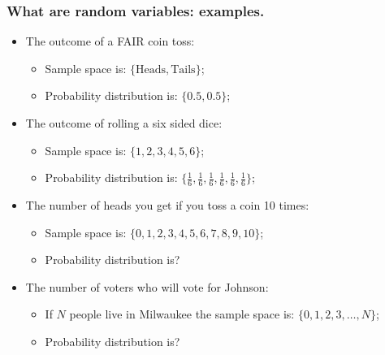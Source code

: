\documentclass[aspectratio=169]{beamer}
\theoremstyle{principle}
\begin{document}
\begin{frame}
\frametitle{What are random variables: examples.}

\begin{itemize}
\item The outcome of a FAIR coin toss:
\begin{itemize}
\item Sample space is: $\{\mbox{Heads},\mbox{Tails}\}$;
\item Probability distribution is: $\{0.5,0.5\}$;
\end{itemize}
\bigskip

\item The outcome of rolling a six sided dice:
\begin{itemize}
\item Sample space is: $\{1,2,3,4,5,6\}$;
\item Probability distribution is: $\{\frac{1}{6},\frac{1}{6},\frac{1}{6},\frac{1}{6},\frac{1}{6},\frac{1}{6}\}$;
\end{itemize}
\bigskip

\item The number of heads you get if you toss a coin 10 times:
\begin{itemize}
\item Sample space is: $\{0,1,2,3,4,5,6,7,8,9,10\}$;
\item Probability distribution is?
\end{itemize}
\bigskip

\item The number of voters who will vote for Johnson:
\begin{itemize}
\item If $N$ people live in Milwaukee the sample space is: $\{0,1,2,3,\hdots,N\}$;
\item Probability distribution is?
\end{itemize}

\end{itemize}

\end{frame}

%
%
%
%
%
%
%
\end{document}
